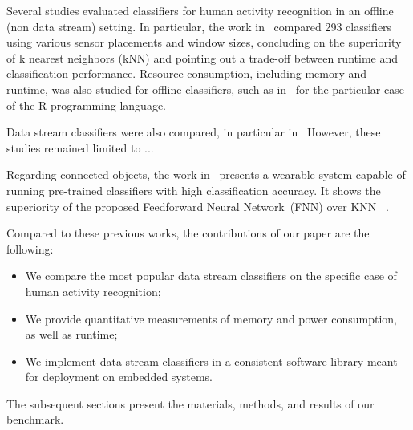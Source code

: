 
Several studies evaluated classifiers for human activity recognition in an
offline (non data stream) setting. In particular, the work
in~\cite{Janidarmian_2017} compared 293 classifiers using various sensor
placements and window sizes, concluding on the superiority of k nearest
neighbors (kNN) and pointing out a trade-off between runtime and
classification performance. Resource consumption, including memory and runtime, was also studied 
for offline classifiers, such as in~\cite{memory_consumption_machine_learning}
for the particular case of the R programming language.

Data stream classifiers were also compared, in particular
in~
However, these studies remained limited to ... 

Regarding connected objects, the work in~\cite{omid_2019} presents a
wearable system capable of running pre-trained classifiers  with high classification accuracy. It shows
the superiority of the proposed Feedforward Neural Network~(FNN) over KNN
~. 

Compared to these previous works, the contributions of our paper are the following:
\begin{itemize}
    \item We compare the most popular data stream classifiers on the specific case of human activity recognition;
    \item We provide quantitative measurements of memory and power consumption, as well as runtime;
    \item We implement data stream classifiers in a consistent software library meant for deployment on embedded systems.
\end{itemize} 
The subsequent sections present the materials, methods, and results of our benchmark.


